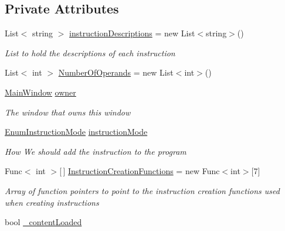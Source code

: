 \subsection*{Private Attributes}
\begin{DoxyCompactItemize}
\item 
List$<$ string $>$ \hyperlink{class_c_p_u___o_s___simulator_1_1_instructions_window_a678ab4df2b78758142472eeed8c5d7ba}{instruction\+Descriptions} = new List$<$string$>$()
\begin{DoxyCompactList}\small\item\em List to hold the descriptions of each instruction \end{DoxyCompactList}\item 
List$<$ int $>$ \hyperlink{class_c_p_u___o_s___simulator_1_1_instructions_window_a6a10065d655000cc37a281b242fb7fb5}{Number\+Of\+Operands} = new List$<$int$>$()
\item 
\hyperlink{class_c_p_u___o_s___simulator_1_1_main_window}{Main\+Window} \hyperlink{class_c_p_u___o_s___simulator_1_1_instructions_window_a954c950c677c61a3b7ed7406b6dc7164}{owner}
\begin{DoxyCompactList}\small\item\em The window that owns this window \end{DoxyCompactList}\item 
\hyperlink{namespace_c_p_u___o_s___simulator_adc17a5a5e004084f05dc8e4d3f70e31f}{Enum\+Instruction\+Mode} \hyperlink{class_c_p_u___o_s___simulator_1_1_instructions_window_aae7addf8e362e26e981b36b9940a53c0}{instruction\+Mode}
\begin{DoxyCompactList}\small\item\em How We should add the instruction to the program \end{DoxyCompactList}\item 
Func$<$ int $>$\mbox{[}$\,$\mbox{]} \hyperlink{class_c_p_u___o_s___simulator_1_1_instructions_window_ae303b32cfc2f5e7cc5ab18df94fd574b}{Instruction\+Creation\+Functions} = new Func$<$int$>$\mbox{[}7\mbox{]}
\begin{DoxyCompactList}\small\item\em Array of function pointers to point to the instruction creation functions used when creating instructions \end{DoxyCompactList}\item 
bool \hyperlink{class_c_p_u___o_s___simulator_1_1_instructions_window_a7755282dffea134038e9e58c931dc297}{\+\_\+content\+Loaded}
\end{DoxyCompactItemize}


